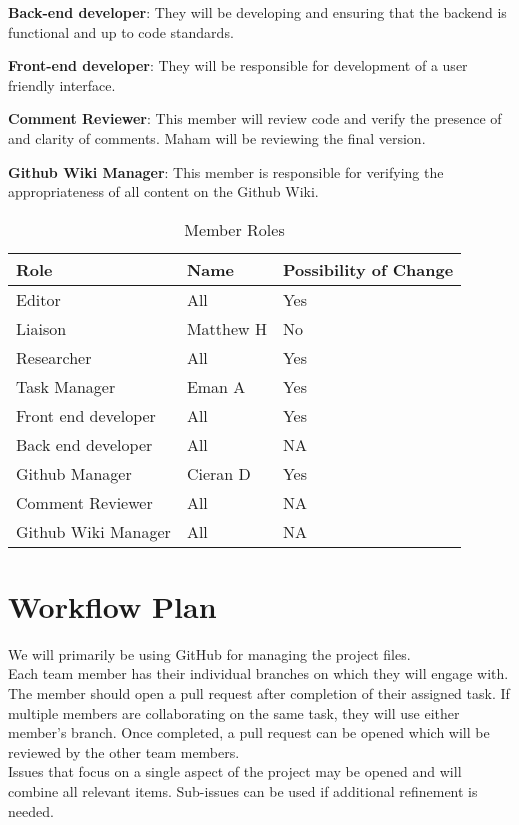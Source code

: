 \documentclass{article}
\begin{document}
\textbf{Back-end developer}: They will be developing and ensuring that the backend is functional and up to code standards.

\textbf{Front-end developer}: They will be responsible for development of a user friendly interface.

\textbf{Comment Reviewer}: This member will review code and verify the presence of and clarity of comments. Maham will be reviewing the final version.

\textbf{Github Wiki Manager}: This member is responsible for verifying the appropriateness of all content on the Github Wiki.

\begin{table}[hp]
\caption{Member Roles} \label{Proposed Assignments}
\begin{tabularx}{\textwidth}{llX}
\toprule
\textbf{Role} & \textbf{Name} & \textbf{Possibility of Change}\\
\midrule
Editor & All & Yes\\
Liaison & Matthew H  & No\\
Researcher & All & Yes \\
Task Manager & Eman A & Yes \\
Front end developer & All & Yes \\
Back end developer & All & NA \\
Github Manager & Cieran D & Yes \\
Comment Reviewer & All & NA \\
Github Wiki Manager & All & NA \\
\bottomrule
\end{tabularx}
\end{table}



\section{Workflow Plan}

We will primarily be using GitHub for managing the project files. \\
Each team member has their individual branches on which they will engage with. 
The member should open a pull request after completion of their assigned task. If 
multiple members are collaborating on the same task, they will use either member's branch. Once completed, 
a pull request can be opened which will be reviewed by the other team members. \\

Issues that focus on a single aspect of the project may be opened and will combine
all relevant items. Sub-issues can be used if additional refinement is needed.
\end{document}
